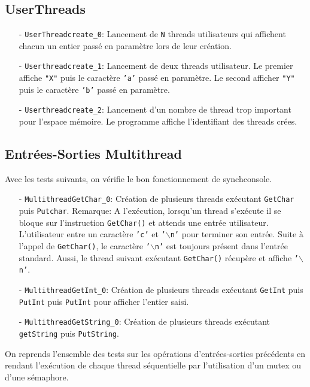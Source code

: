 \documentclass[11pt]{article}
\theoremstyle{definition}
\theoremstyle{definition}
\begin{document}
\subsection{UserThreads}
\begin{itemize}
\item[-] \texttt{UserThreadcreate\_0}: Lancement de \texttt{N} threads utilisateurs qui affichent chacun un entier passé en paramètre lors de leur
  création.
\item[-] \texttt{Userthreadcreate\_1}: Lancement de deux threads utilisateur. Le premier affiche \texttt{"X"} puis le caractère \texttt{'a'} passé en paramètre.
  Le second afficher \texttt{"Y"} puis le caractère \texttt{'b'} passé en paramètre.
\item[-] \texttt{Userthreadcreate\_2}: Lancement d'un nombre de thread trop important pour l'espace mémoire.
  Le programme affiche l'identifiant des threads crées.
\end{itemize}

\subsection{Entrées-Sorties Multithread}
Avec les tests suivants, on vérifie le bon fonctionnement de synchconsole.
\begin{itemize}
\item[-] \texttt{MultithreadGetChar\_0}: Création de plusieurs threads exécutant \texttt{GetChar}
  puis \texttt{Putchar}.
  Remarque:
  A l'exécution, lorsqu'un thread s'exécute il se bloque sur l'instruction \texttt{GetChar()} et attends une
  entrée utilisateur. L'utilisateur entre un caractère \texttt{'c'} et \texttt{'$\backslash$n'} pour terminer son entrée.
  Suite à l'appel de \texttt{GetChar()}, le caractère \texttt{'$\backslash$n'} est toujours
  présent dans l'entrée standard. Aussi, le thread suivant exécutant \texttt{GetChar()} récupère et
  affiche \texttt{'$\backslash$n'}.
\item[-] \texttt{MultithreadGetInt\_0}: Création de plusieurs threads exécutant \texttt{GetInt} puis  \texttt{PutInt}
  puis \texttt{PutInt} pour afficher l'entier saisi.
\item[-] \texttt{MultithreadGetString\_0}: Création de plusieurs threads exécutant
  \texttt{getString} puis \texttt{PutString}.
\end{itemize}
On reprends l'ensemble des tests sur les opérations d'entrées-sorties précédents en rendant l'exécution de chaque thread séquentielle par l'utilisation d'un mutex ou d'une sémaphore.
\end{document}
